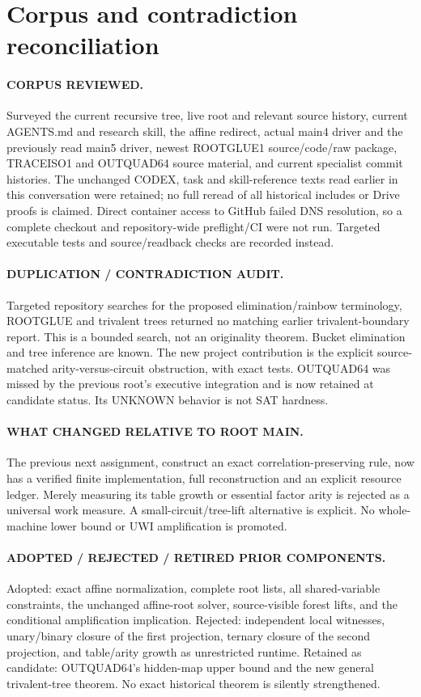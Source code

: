 \documentclass[11pt]{article}
\begin{document}
\section{Corpus and contradiction reconciliation}
\paragraph{CORPUS REVIEWED.}
Surveyed the current recursive tree, live root and relevant source history,
current AGENTS.md and research skill, the affine redirect, actual main4 driver
and the previously read main5 driver, newest ROOTGLUE1 source/code/raw package,
TRACEISO1 and OUTQUAD64 source material, and current specialist commit histories.
The unchanged CODEX, task and skill-reference texts read earlier in this
conversation were retained; no full reread of all historical includes or
Drive proofs is claimed. Direct container access to GitHub failed DNS
resolution, so a complete checkout and repository-wide preflight/CI were not
run. Targeted executable tests and source/readback checks are recorded instead.

\paragraph{DUPLICATION / CONTRADICTION AUDIT.}
Targeted repository searches for the proposed elimination/rainbow terminology,
ROOTGLUE and trivalent trees returned no matching earlier trivalent-boundary
report. This is a bounded search, not an originality theorem. Bucket
elimination and tree inference are known. The new project contribution is the
explicit source-matched arity-versus-circuit obstruction, with exact tests.
OUTQUAD64 was missed by the previous root's executive integration and is
now retained at candidate status. Its UNKNOWN behavior is not SAT hardness.

\paragraph{WHAT CHANGED RELATIVE TO ROOT MAIN.}
The previous next assignment, construct an exact correlation-preserving rule,
now has a verified finite implementation, full reconstruction and an explicit
resource ledger. Merely measuring its table growth or essential factor arity
is rejected as a universal work measure. A small-circuit/tree-lift alternative
is explicit. No whole-machine lower bound or UWI amplification is promoted.

\paragraph{ADOPTED / REJECTED / RETIRED PRIOR COMPONENTS.}
Adopted: exact affine normalization, complete root lists, all shared-variable
constraints, the unchanged affine-root solver, source-visible forest lifts,
and the conditional amplification implication. Rejected: independent local
witnesses, unary/binary closure of the first projection, ternary closure of
the second projection, and table/arity growth as unrestricted runtime.
Retained as candidate: OUTQUAD64's hidden-map upper bound and the new general
trivalent-tree theorem. No exact historical theorem is silently strengthened.
\end{document}

